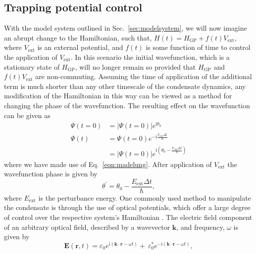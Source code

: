 \subsection{Trapping potential control}\label{ss:pert_opt_latt}
With the model system outlined in Sec.~\ref{sec:modelsystem}, we will now imagine an abrupt change to the Hamiltonian, such that, $H(t) = H_{\textrm{GP}} + f(t) V_{\textrm{ext}}$, where $V_{\textrm{ext}}$ is an external potential, and $f(t)$ is some function of time to control the application of $V_{\textrm{ext}}$. In this scenario the initial wavefunction, which is a stationary state of $H_{\textrm{GP}}$, will no longer remain so provided that $H_{\textrm{GP}}$ and $f(t) V_{\textrm{ext}}$ are non-commuting. Assuming the time of application of the additional term is much shorter than any other timescale of the condensate dynamics, any modification of the Hamiltonian in this way can be viewed as a method for changing the phase of the wavefunction.
The resulting effect on the wavefunction can be given as
\begin{subequations}
\begin{align}
    \Psi(t=0) &= |\Psi(t=0)|e^{\textrm{i}\theta_0} \\
    \Psi(t) &= \Psi(t=0) e^{ - \textrm{i} \frac{ V_{\textrm{ext}} \Delta t}{\hbar}} \\
            &= |\Psi(t=0)| e^{\textrm{i}\left(\theta_0 - \frac{V_{\textrm{ext}} \Delta t}{\hbar}\right)} \nonumber
\end{align}
\end{subequations}
where we have made use of Eq.~\eqref{eqn:madelung}. After application of $V_{\textrm{ext}}$ the wavefunction phase is given by
\begin{equation}
    \theta^{'} = \theta_0 - \frac{E_{\textrm{ext}} \Delta t}{\hbar},
\end{equation}
where $E_{\textrm{ext}}$ is the perturbance energy. One commonly used method to manipulate the condensate is through the use of optical potentials, which offer a large degree of control over the respective system's Hamiltonian \cite{BEC:Bloch_revmodphys_2008}. The electric field component of an arbitrary optical field, described by a wavevector $\mathbf{k}$, and frequency, $\omega$ is given by
\begin{equation}
    \mathbf{E}(\mathbf{r},t) = \varepsilon_0 e^{\textrm{i}\left(\mathbf{k}\cdot\mathbf{r} - \omega t\right)} + \ \varepsilon_0^{*} e^{-\textrm{i}\left(\mathbf{k}\cdot\mathbf{r} - \omega t\right)},
\end{equation}
